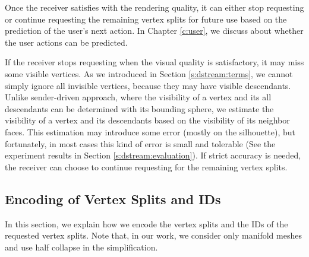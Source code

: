     Once the receiver satisfies with the rendering quality, it 
    can either stop requesting or continue requesting the remaining vertex splits
    for future use based on the prediction of the user's next action. 
    In Chapter \ref{c:user}, we discuss about whether the user actions can be predicted.

    If the receiver stops requesting %
    when the visual quality is satisfactory, it may miss some visible vertices.
    As we introduced in Section \ref{s:dstream:terms}, we cannot simply ignore 
    all invisible vertices, because they may have visible descendants.
    Unlike sender-driven approach, where the visibility of a vertex and its all descendants
    can be determined with its bounding sphere, we estimate the visibility of 
    a vertex and its descendants based on the visibility of its neighbor faces. 
    This estimation may introduce some error (mostly on the silhouette), 
    but fortunately, in most cases this kind of error is small and tolerable
    (See the experiment results in Section \ref{s:dstream:evaluation}).
    If strict accuracy is needed, the receiver can choose to continue requesting 
    for the remaining vertex splits.  
    
    \subsection{Encoding of Vertex Splits and IDs}
    \label{ss:dstream:encoding}

	In this section, we explain how we encode the vertex splits 
    and the IDs of the requested vertex splits.  
    Note that, in our work, we consider only manifold meshes and use half 
	collapse in the simplification.
    
